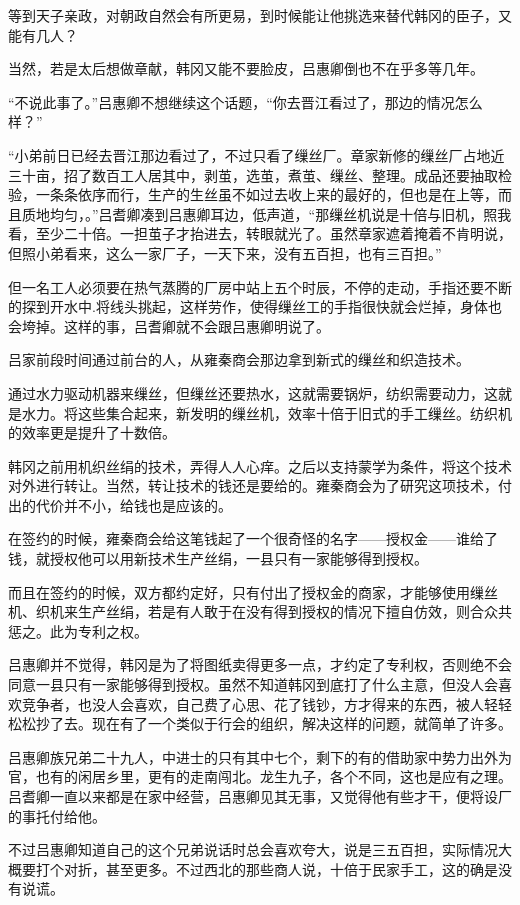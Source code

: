 等到天子亲政，对朝政自然会有所更易，到时候能让他挑选来替代韩冈的臣子，又能有几人？

当然，若是太后想做章献，韩冈又能不要脸皮，吕惠卿倒也不在乎多等几年。

“不说此事了。”吕惠卿不想继续这个话题，“你去晋江看过了，那边的情况怎么样？”

“小弟前日已经去晋江那边看过了，不过只看了缫丝厂。章家新修的缫丝厂占地近三十亩，招了数百工人居其中，剥茧，选茧，煮茧、缫丝、整理。成品还要抽取检验，一条条依序而行，生产的生丝虽不如过去收上来的最好的，但也是在上等，而且质地均匀，。”吕耆卿凑到吕惠卿耳边，低声道，“那缫丝机说是十倍与旧机，照我看，至少二十倍。一担茧子才抬进去，转眼就光了。虽然章家遮着掩着不肯明说，但照小弟看来，这么一家厂子，一天下来，没有五百担，也有三百担。”

但一名工人必须要在热气蒸腾的厂房中站上五个时辰，不停的走动，手指还要不断的探到开水中.将线头挑起，这样劳作，使得缫丝工的手指很快就会烂掉，身体也会垮掉。这样的事，吕耆卿就不会跟吕惠卿明说了。

吕家前段时间通过前台的人，从雍秦商会那边拿到新式的缫丝和织造技术。

通过水力驱动机器来缫丝，但缫丝还要热水，这就需要锅炉，纺织需要动力，这就是水力。将这些集合起来，新发明的缫丝机，效率十倍于旧式的手工缫丝。纺织机的效率更是提升了十数倍。

韩冈之前用机织丝绢的技术，弄得人人心痒。之后以支持蒙学为条件，将这个技术对外进行转让。当然，转让技术的钱还是要给的。雍秦商会为了研究这项技术，付出的代价并不小，给钱也是应该的。

在签约的时候，雍秦商会给这笔钱起了一个很奇怪的名字——授权金——谁给了钱，就授权他可以用新技术生产丝绢，一县只有一家能够得到授权。

而且在签约的时候，双方都约定好，只有付出了授权金的商家，才能够使用缫丝机、织机来生产丝绢，若是有人敢于在没有得到授权的情况下擅自仿效，则合众共惩之。此为专利之权。

吕惠卿并不觉得，韩冈是为了将图纸卖得更多一点，才约定了专利权，否则绝不会同意一县只有一家能够得到授权。虽然不知道韩冈到底打了什么主意，但没人会喜欢竞争者，也没人会喜欢，自己费了心思、花了钱钞，方才得来的东西，被人轻轻松松抄了去。现在有了一个类似于行会的组织，解决这样的问题，就简单了许多。

吕惠卿族兄弟二十九人，中进士的只有其中七个，剩下的有的借助家中势力出外为官，也有的闲居乡里，更有的走南闯北。龙生九子，各个不同，这也是应有之理。吕耆卿一直以来都是在家中经营，吕惠卿见其无事，又觉得他有些才干，便将设厂的事托付给他。

不过吕惠卿知道自己的这个兄弟说话时总会喜欢夸大，说是三五百担，实际情况大概要打个对折，甚至更多。不过西北的那些商人说，十倍于民家手工，这的确是没有说谎。

